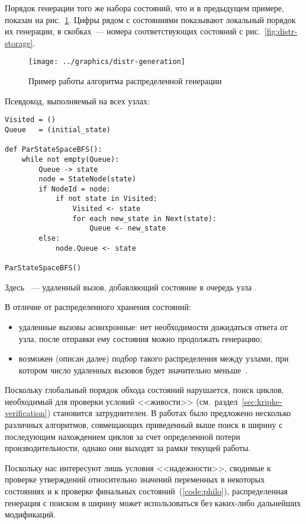 Порядок генерации того же набора состояний, что и в предыдущем примере, показан на
рис.~\ref{fig:distr-generation}. Цифры рядом с состояниями показывают локальный порядок их
генерации, в скобках~--- номера соответствующих состояний с рис.~\ref{fig:distr-storage}.

\begin{figure}[!htb]
  \centering
  \texttt{[image: ../graphics/distr-generation]}
  \caption{Пример работы алгоритма распределенной генерации}
  \label{fig:distr-generation}
\end{figure}

Псевдокод, выполняемый на всех узлах:

\begin{lstlisting}[style=pseudocode]
Visited = ()
Queue   = (initial_state)

def ParStateSpaceBFS():
    while not empty(Queue):
        Queue -> state
        node = StateNode(state)
        if NodeId = node:
            if not state in Visited:
                Visited <- state
                for each new_state in Next(state):
                    Queue <- new_state
        else:
            node.Queue <- state

ParStateSpaceBFS()
\end{lstlisting}

Здесь ~--- удаленный вызов, добавляющий состояние в очередь узла
.

В отличие от распределенного хранения состояний:
\begin{itemize}
\item удаленные вызовы асинхронные: нет необходимости дожидаться ответа от узла, после
  отправки ему состояния можно продолжать генерацию;
\item возможен (описан далее) подбор такого распределения  между узлами,
  при котором число удаленных вызовов будет значительно меньше~\cite{LS99}.
\end{itemize}

Поскольку глобальный порядок обхода состояний нарушается, поиск циклов, необходимый для
проверки условий <<живости>> (см.~раздел~\ref{sec:kripke-verification}) становится
затруднителен. В работах \cite{DLTL1,DLTL2} было предложено несколько различных
алгоритмов, совмещающих приведенный выше поиск в ширину с последующим нахождением циклов
за счет определенной потери производительности, однако они выходят за рамки текущей
работы.

Поскольку нас интересуют лишь условия <<надежности>>, сводимые к проверке утверждений
относительно значений переменных в некоторых состояниях и к проверке финальных
состояний~(\ref{code:philo}), распределенная генерация с поиском в ширину может
использоваться без каких-либо дальнейших модификаций.


